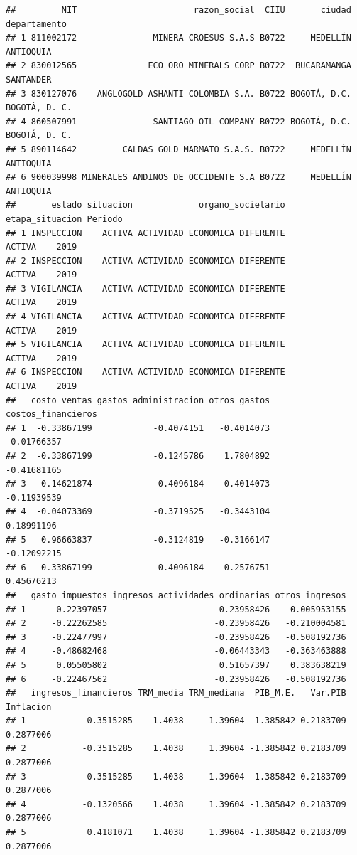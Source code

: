 \documentclass[
  11pt,
  a4paper,
]{book}
\begin{document}
\begin{verbatim}
##         NIT                       razon_social  CIIU       ciudad  departamento
## 1 811002172               MINERA CROESUS S.A.S B0722     MEDELLÍN     ANTIOQUIA
## 2 830012565              ECO ORO MINERALS CORP B0722  BUCARAMANGA     SANTANDER
## 3 830127076    ANGLOGOLD ASHANTI COLOMBIA S.A. B0722 BOGOTÁ, D.C. BOGOTÁ, D. C.
## 4 860507991               SANTIAGO OIL COMPANY B0722 BOGOTÁ, D.C. BOGOTÁ, D. C.
## 5 890114642         CALDAS GOLD MARMATO S.A.S. B0722     MEDELLÍN     ANTIOQUIA
## 6 900039998 MINERALES ANDINOS DE OCCIDENTE S.A B0722     MEDELLÍN     ANTIOQUIA
##       estado situacion             organo_societario etapa_situacion Periodo
## 1 INSPECCION    ACTIVA ACTIVIDAD ECONOMICA DIFERENTE          ACTIVA    2019
## 2 INSPECCION    ACTIVA ACTIVIDAD ECONOMICA DIFERENTE          ACTIVA    2019
## 3 VIGILANCIA    ACTIVA ACTIVIDAD ECONOMICA DIFERENTE          ACTIVA    2019
## 4 VIGILANCIA    ACTIVA ACTIVIDAD ECONOMICA DIFERENTE          ACTIVA    2019
## 5 VIGILANCIA    ACTIVA ACTIVIDAD ECONOMICA DIFERENTE          ACTIVA    2019
## 6 INSPECCION    ACTIVA ACTIVIDAD ECONOMICA DIFERENTE          ACTIVA    2019
##   costo_ventas gastos_administracion otros_gastos costos_financieros
## 1  -0.33867199            -0.4074151   -0.4014073        -0.01766357
## 2  -0.33867199            -0.1245786    1.7804892        -0.41681165
## 3   0.14621874            -0.4096184   -0.4014073        -0.11939539
## 4  -0.04073369            -0.3719525   -0.3443104         0.18991196
## 5   0.96663837            -0.3124819   -0.3166147        -0.12092215
## 6  -0.33867199            -0.4096184   -0.2576751         0.45676213
##   gasto_impuestos ingresos_actividades_ordinarias otros_ingresos
## 1     -0.22397057                     -0.23958426    0.005953155
## 2     -0.22262585                     -0.23958426   -0.210004581
## 3     -0.22477997                     -0.23958426   -0.508192736
## 4     -0.48682468                     -0.06443343   -0.363463888
## 5      0.05505802                      0.51657397    0.383638219
## 6     -0.22467562                     -0.23958426   -0.508192736
##   ingresos_financieros TRM_media TRM_mediana  PIB_M.E.   Var.PIB Inflacion
## 1           -0.3515285    1.4038     1.39604 -1.385842 0.2183709 0.2877006
## 2           -0.3515285    1.4038     1.39604 -1.385842 0.2183709 0.2877006
## 3           -0.3515285    1.4038     1.39604 -1.385842 0.2183709 0.2877006
## 4           -0.1320566    1.4038     1.39604 -1.385842 0.2183709 0.2877006
## 5            0.4181071    1.4038     1.39604 -1.385842 0.2183709 0.2877006

\end{verbatim}
\end{document}
